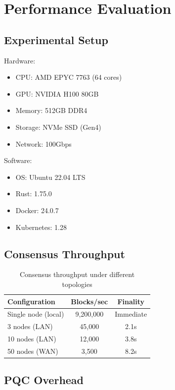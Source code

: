 \section{Performance Evaluation}


\subsection{Experimental Setup}

Hardware:
\begin{itemize}
\item CPU: AMD EPYC 7763 (64 cores)
\item GPU: NVIDIA H100 80GB
\item Memory: 512GB DDR4
\item Storage: NVMe SSD (Gen4)
\item Network: 100Gbps
\end{itemize}

Software:
\begin{itemize}
\item OS: Ubuntu 22.04 LTS
\item Rust: 1.75.0
\item Docker: 24.0.7
\item Kubernetes: 1.28
\end{itemize}

\subsection{Consensus Throughput}

\begin{table}[h]
\centering
\begin{tabular}{|l|c|c|}
\hline
\textbf{Configuration} & \textbf{Blocks/sec} & \textbf{Finality} \\
\hline
Single node (local) & 9,200,000 & Immediate \\
3 nodes (LAN) & 45,000 & 2.1s \\
10 nodes (LAN) & 12,000 & 3.8s \\
50 nodes (WAN) & 3,500 & 8.2s \\
\hline
\end{tabular}
\caption{Consensus throughput under different topologies}
\label{tab:consensus}
\end{table}

\subsection{PQC Overhead}

